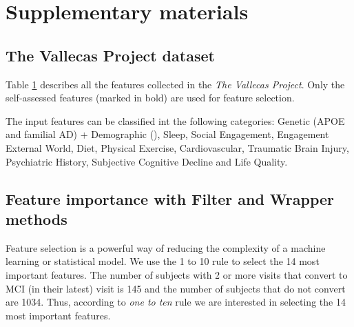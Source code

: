 \documentclass[preprint,12pt]{elsarticle}
\begin{document}
\newpage
\appendix
\section{Supplementary materials}

\subsection{The Vallecas Project dataset}
\label{sup:valle}
Table \ref{} describes all the features collected in the \emph{The Vallecas Project}. Only the self-assessed features (marked in bold) are used for feature selection.

The input features can be classified int the following categories: Genetic (APOE and familial AD) + Demographic (), Sleep, Social Engagement, Engagement External World, Diet, Physical Exercise, Cardiovascular, Traumatic Brain Injury, Psychiatric History, Subjective Cognitive Decline and Life Quality.





\subsection{Feature importance with Filter and Wrapper methods}
\label{sup:filwra}
Feature selection is a powerful way of reducing the complexity of a machine learning or statistical model. We use the 1 to 10 rule to select the 14 most important features. The number of subjects with 2 or more visits that convert to MCI (in their latest) visit is 145 and the number of subjects that do not convert are 1034. Thus, according to \emph{one to ten} rule we are interested in selecting the 14 most important features.
\end{document}
